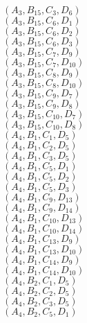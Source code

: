 \documentclass[14pt]{article}
\begin{document}
    $({A}_{3}, {B}_{15}, {C}_{3}, {D}_{6}) $ \\ 
    $({A}_{3}, {B}_{15}, {C}_{6}, {D}_{1}) $ \\ 
    $({A}_{3}, {B}_{15}, {C}_{6}, {D}_{2}) $ \\ 
    $({A}_{3}, {B}_{15}, {C}_{6}, {D}_{3}) $ \\ 
    $({A}_{3}, {B}_{15}, {C}_{7}, {D}_{9}) $ \\ 
    $({A}_{3}, {B}_{15}, {C}_{7}, {D}_{10}) $ \\ 
    $({A}_{3}, {B}_{15}, {C}_{8}, {D}_{9}) $ \\ 
    $({A}_{3}, {B}_{15}, {C}_{8}, {D}_{10}) $ \\ 
    $({A}_{3}, {B}_{15}, {C}_{9}, {D}_{7}) $ \\ 
    $({A}_{3}, {B}_{15}, {C}_{9}, {D}_{8}) $ \\ 
    $({A}_{3}, {B}_{15}, {C}_{10}, {D}_{7}) $ \\ 
    $({A}_{3}, {B}_{15}, {C}_{10}, {D}_{8}) $ \\ 
    $({A}_{4}, {B}_{1}, {C}_{1}, {D}_{5}) $ \\ 
    $({A}_{4}, {B}_{1}, {C}_{2}, {D}_{5}) $ \\ 
    $({A}_{4}, {B}_{1}, {C}_{3}, {D}_{5}) $ \\ 
    $({A}_{4}, {B}_{1}, {C}_{5}, {D}_{1}) $ \\ 
    $({A}_{4}, {B}_{1}, {C}_{5}, {D}_{2}) $ \\ 
    $({A}_{4}, {B}_{1}, {C}_{5}, {D}_{3}) $ \\ 
    $({A}_{4}, {B}_{1}, {C}_{9}, {D}_{13}) $ \\ 
    $({A}_{4}, {B}_{1}, {C}_{9}, {D}_{14}) $ \\ 
    $({A}_{4}, {B}_{1}, {C}_{10}, {D}_{13}) $ \\ 
    $({A}_{4}, {B}_{1}, {C}_{10}, {D}_{14}) $ \\ 
    $({A}_{4}, {B}_{1}, {C}_{13}, {D}_{9}) $ \\ 
    $({A}_{4}, {B}_{1}, {C}_{13}, {D}_{10}) $ \\ 
    $({A}_{4}, {B}_{1}, {C}_{14}, {D}_{9}) $ \\ 
    $({A}_{4}, {B}_{1}, {C}_{14}, {D}_{10}) $ \\ 
    $({A}_{4}, {B}_{2}, {C}_{1}, {D}_{5}) $ \\ 
    $({A}_{4}, {B}_{2}, {C}_{2}, {D}_{5}) $ \\ 
    $({A}_{4}, {B}_{2}, {C}_{3}, {D}_{5}) $ \\ 
    $({A}_{4}, {B}_{2}, {C}_{5}, {D}_{1}) $ \\ 
\end{document}
